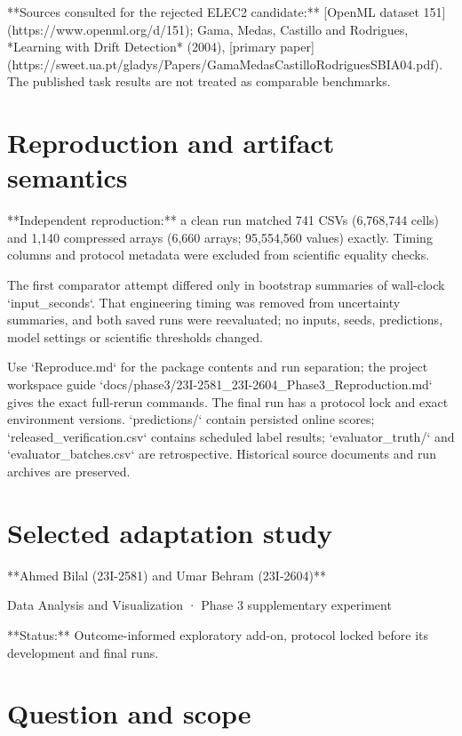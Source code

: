 \documentclass[11pt,a4paper]{article}
\begin{document}
**Sources consulted for the rejected ELEC2 candidate:** [OpenML dataset 151](https://www.openml.org/d/151); Gama, Medas, Castillo and Rodrigues, *Learning with Drift Detection* (2004), [primary paper](https://sweet.ua.pt/gladys/Papers/GamaMedasCastilloRodriguesSBIA04.pdf). The published task results are not treated as comparable benchmarks.\par

\section{Reproduction and artifact semantics}

**Independent reproduction:** a clean run matched 741 CSVs (6,768,744 cells) and 1,140 compressed arrays (6,660 arrays; 95,554,560 values) exactly. Timing columns and protocol metadata were excluded from scientific equality checks.\par
The first comparator attempt differed only in bootstrap summaries of wall-clock `input\_seconds`. That engineering timing was removed from uncertainty summaries, and both saved runs were reevaluated; no inputs, seeds, predictions, model settings or scientific thresholds changed.\par

Use `Reproduce.md` for the package contents and run separation; the project workspace guide `docs/phase3/23I-2581\_23I-2604\_Phase3\_Reproduction.md` gives the exact full-rerun commands. The final run has a protocol lock and exact environment versions. `predictions/` contain persisted online scores; `released\_verification.csv` contains scheduled label results; `evaluator\_truth/` and `evaluator\_batches.csv` are retrospective. Historical source documents and run archives are preserved.\par


\section{Selected adaptation study}


**Ahmed Bilal (23I-2581) and Umar Behram (23I-2604)**\par
Data Analysis and Visualization · Phase 3 supplementary experiment\par

**Status:** Outcome-informed exploratory add-on, protocol locked before its development and final runs.\par

\section{Question and scope}
\end{document}
